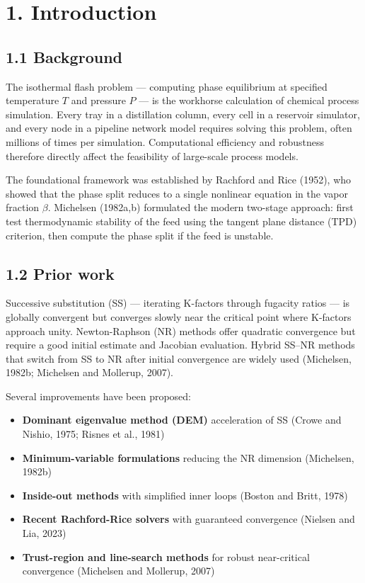 \documentclass[review,3p]{custom}
\begin{document}
\section{1. Introduction}



\subsection{1.1 Background}

The isothermal flash problem — computing phase equilibrium at specified temperature
$T$ and pressure $P$ — is the workhorse calculation of chemical process simulation.
Every tray in a distillation column, every cell in a reservoir simulator, and every
node in a pipeline network model requires solving this problem, often millions of
times per simulation. Computational efficiency and robustness therefore directly
affect the feasibility of large-scale process models.

The foundational framework was established by Rachford and Rice (1952), who showed
that the phase split reduces to a single nonlinear equation in the vapor fraction
$\beta$. Michelsen (1982a,b) formulated the modern two-stage approach: first test
thermodynamic stability of the feed using the tangent plane distance (TPD) criterion,
then compute the phase split if the feed is unstable.

\subsection{1.2 Prior work}

Successive substitution (SS) — iterating K-factors through fugacity ratios — is
globally convergent but converges slowly near the critical point where K-factors
approach unity. Newton-Raphson (NR) methods offer quadratic convergence but require
a good initial estimate and Jacobian evaluation. Hybrid SS–NR methods that switch
from SS to NR after initial convergence are widely used (Michelsen, 1982b; Michelsen
and Mollerup, 2007).

Several improvements have been proposed:

\begin{itemize}
  \item \textbf{Dominant eigenvalue method (DEM)} acceleration of SS (Crowe and Nishio, 1975; Risnes et al., 1981)
  \item \textbf{Minimum-variable formulations} reducing the NR dimension (Michelsen, 1982b)
  \item \textbf{Inside-out methods} with simplified inner loops (Boston and Britt, 1978)
  \item \textbf{Recent Rachford-Rice solvers} with guaranteed convergence (Nielsen and Lia, 2023)
  \item \textbf{Trust-region and line-search methods} for robust near-critical convergence (Michelsen and Mollerup, 2007)
\end{itemize}
\end{document}
